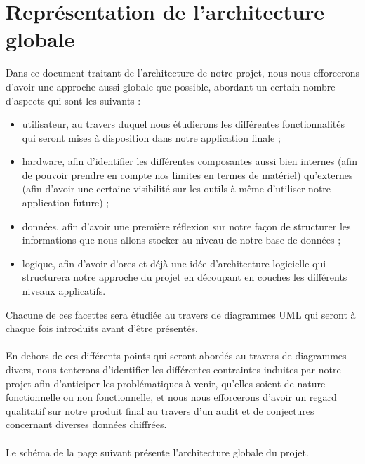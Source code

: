 \documentclass{life-fr}
\begin{document}

\chapter{Représentation de l’architecture globale}

  Dans ce document traitant de l'architecture de notre projet, nous nous efforcerons d'avoir une approche aussi globale que possible, abordant un certain nombre d’aspects qui sont les suivants :

\begin{itemize}
      \item utilisateur, au travers duquel nous étudierons les différentes fonctionnalités qui seront mises à disposition dans notre application finale ;
      \item hardware, afin d'identifier les différentes composantes aussi bien internes (afin de pouvoir prendre en compte nos limites en termes de matériel) qu'externes (afin d'avoir une certaine visibilité sur les outils à même d'utiliser notre application future) ;
      \item données, afin d'avoir une première réflexion sur notre façon de structurer les informations que nous allons stocker au niveau de notre base de données ;
      \item logique, afin d'avoir d'ores et déjà une idée d'architecture logicielle qui structurera notre approche du projet en découpant en couches les différents niveaux applicatifs.
\end{itemize}

Chacune de ces facettes sera étudiée au travers de diagrammes UML qui seront à chaque fois introduits avant d'être présentés.\\
\\
En dehors de ces différents points qui seront abordés au travers de diagrammes divers, nous tenterons d'identifier les différentes contraintes induites par notre projet afin d'anticiper les problématiques à venir, qu'elles soient de nature fonctionnelle ou non fonctionnelle, et nous nous efforcerons d'avoir un regard qualitatif sur notre produit final au travers d'un audit et de conjectures concernant diverses données chiffrées.
\\
\\
Le schéma de la page suivant présente l'architecture globale du projet.
\newpage
\end{document}
